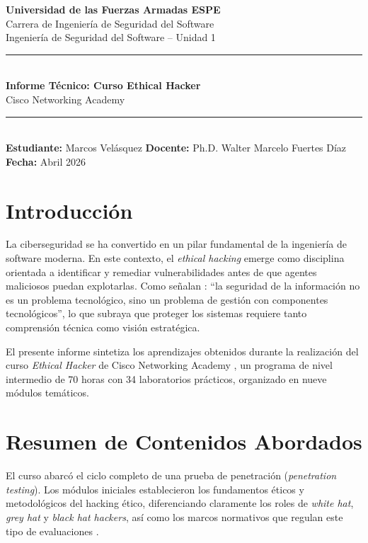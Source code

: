 \documentclass[12pt, a4paper]{article}
\begin{document}
\begin{center}
    {\large \textbf{Universidad de las Fuerzas Armadas ESPE}} \\[2pt]
    {\normalsize Carrera de Ingeniería de Seguridad del Software} \\
    {\normalsize Ingeniería de Seguridad del Software -- Unidad 1} \\[6pt]
    \rule{\linewidth}{0.4pt}\\[4pt]
    {\large \textbf{Informe Técnico: Curso Ethical Hacker}} \\
    {\normalsize Cisco Networking Academy} \\[4pt]
    \rule{\linewidth}{0.4pt}\\[4pt]
    {\small \textbf{Estudiante:} Marcos Velásquez \quad
     \textbf{Docente:} Ph.D. Walter Marcelo Fuertes Díaz \quad
     \textbf{Fecha:} Abril 2026}
\end{center}

\section{Introducción}

La ciberseguridad se ha convertido en un pilar fundamental de la ingeniería de software moderna. En este contexto, el \textit{ethical hacking} emerge como disciplina orientada a identificar y remediar vulnerabilidades antes de que agentes maliciosos puedan explotarlas. Como señalan \citet{Whitman2021}: ``la seguridad de la información no es un problema tecnológico, sino un problema de gestión con componentes tecnológicos'', lo que subraya que proteger los sistemas requiere tanto comprensión técnica como visión estratégica.

El presente informe sintetiza los aprendizajes obtenidos durante la realización del curso \textit{Ethical Hacker} de Cisco Networking Academy \citep{Cisco2024}, un programa de nivel intermedio de 70 horas con 34 laboratorios prácticos, organizado en nueve módulos temáticos.

\section{Resumen de Contenidos Abordados}

El curso abarcó el ciclo completo de una prueba de penetración (\textit{penetration testing}). Los módulos iniciales establecieron los fundamentos éticos y metodológicos del hacking ético, diferenciando claramente los roles de \textit{white hat}, \textit{grey hat} y \textit{black hat hackers}, así como los marcos normativos que regulan este tipo de evaluaciones \citep{EC-Council2022}.
\end{document}
